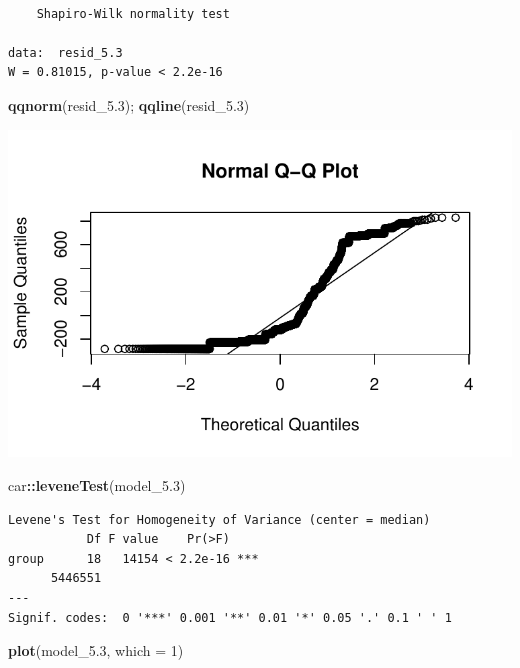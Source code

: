 \documentclass[
  british,
  10pt,
]{article}
\newenvironment{Shaded}{\begin{snugshade}}{\end{snugshade}}
\newcommand{\AttributeTok}[1]{\textcolor[rgb]{0.13,0.29,0.53}{#1}}
\newcommand{\DecValTok}[1]{\textcolor[rgb]{0.00,0.00,0.81}{#1}}
\newcommand{\FloatTok}[1]{\textcolor[rgb]{0.00,0.00,0.81}{#1}}
\newcommand{\FunctionTok}[1]{\textcolor[rgb]{0.13,0.29,0.53}{\textbf{#1}}}
\newcommand{\NormalTok}[1]{#1}
\newcommand{\SpecialCharTok}[1]{\textcolor[rgb]{0.81,0.36,0.00}{\textbf{#1}}}
\begin{document}
\begin{verbatim}

    Shapiro-Wilk normality test

data:  resid_5.3
W = 0.81015, p-value < 2.2e-16
\end{verbatim}

\begin{Shaded}
\begin{Highlighting}[]
\FunctionTok{qqnorm}\NormalTok{(resid\_5}\FloatTok{.3}\NormalTok{); }\FunctionTok{qqline}\NormalTok{(resid\_5}\FloatTok{.3}\NormalTok{)}
\end{Highlighting}
\end{Shaded}

\begin{center}
\includegraphics[width=0.6\linewidth,height=\textheight,keepaspectratio]{BCB744_Biostats_Prac_Exam_2025_files/figure-pdf/chunk19-1.pdf}
\end{center}

\begin{Shaded}
\begin{Highlighting}[]
\NormalTok{car}\SpecialCharTok{::}\FunctionTok{leveneTest}\NormalTok{(model\_5}\FloatTok{.3}\NormalTok{)}
\end{Highlighting}
\end{Shaded}

\begin{verbatim}
Levene's Test for Homogeneity of Variance (center = median)
           Df F value    Pr(>F)    
group      18   14154 < 2.2e-16 ***
      5446551                      
---
Signif. codes:  0 '***' 0.001 '**' 0.01 '*' 0.05 '.' 0.1 ' ' 1
\end{verbatim}

\begin{Shaded}
\begin{Highlighting}[]
\FunctionTok{plot}\NormalTok{(model\_5}\FloatTok{.3}\NormalTok{, }\AttributeTok{which =} \DecValTok{1}\NormalTok{)}
\end{Highlighting}
\end{Shaded}
\end{document}
